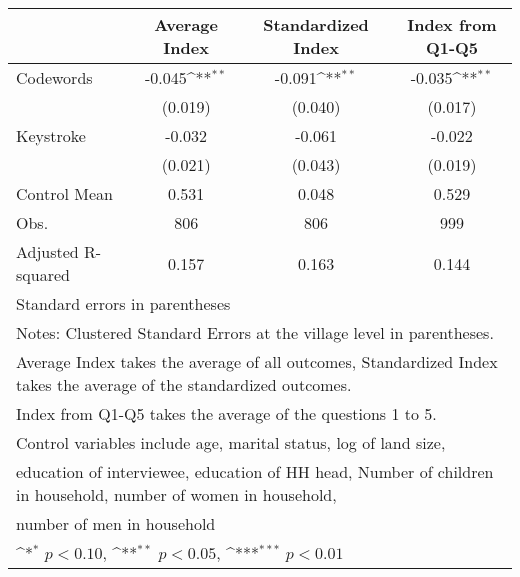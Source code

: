 {
\def\sym#1{\ifmmode^{#1}\else\(^{#1}\)\fi}
\begin{tabular}{l*{3}{c}}
\toprule
                &\multicolumn{1}{c}{Average Index}&\multicolumn{1}{c}{Standardized Index}&\multicolumn{1}{c}{Index from Q1-Q5}\\
\midrule
Codewords       &   -0.045\sym{**} &   -0.091\sym{**} &   -0.035\sym{**} \\
                &  (0.019)         &  (0.040)         &  (0.017)         \\
Keystroke       &   -0.032         &   -0.061         &   -0.022         \\
                &  (0.021)         &  (0.043)         &  (0.019)         \\
\midrule
Control Mean    &    0.531         &    0.048         &    0.529         \\
Obs.            &      806         &      806         &      999         \\
Adjusted R-squared&    0.157         &    0.163         &    0.144         \\
\bottomrule
\multicolumn{4}{l}{\footnotesize Standard errors in parentheses}\\
\multicolumn{4}{l}{\footnotesize Notes: Clustered Standard Errors at the village level in parentheses.}\\
\multicolumn{4}{l}{\footnotesize Average Index takes the average of all outcomes, Standardized Index takes the average of the standardized outcomes.}\\
\multicolumn{4}{l}{\footnotesize Index from Q1-Q5 takes the average of the questions 1 to 5.}\\
\multicolumn{4}{l}{\footnotesize Control variables include age, marital status, log of land size,}\\
\multicolumn{4}{l}{\footnotesize education of interviewee, education of HH head, Number of children in household, number of women in household,}\\
\multicolumn{4}{l}{\footnotesize number of men in household}\\
\multicolumn{4}{l}{\footnotesize \sym{*} \(p<0.10\), \sym{**} \(p<0.05\), \sym{***} \(p<0.01\)}\\
\end{tabular}
}
